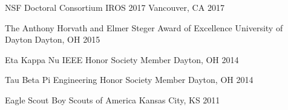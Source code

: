 




\begin{cvhonors}


\cvhonor
{NSF Doctoral Consortium} %
{IROS 2017} %
{Vancouver, CA} %
{2017} %


\cvhonor
{The Anthony Horvath and Elmer Steger Award of Excellence} %
{University of Dayton} %
{Dayton, OH} %
{2015} %


\cvhonor
{Eta Kappa Nu IEEE Honor Society} %
{Member} %
{Dayton, OH} %
{2014} %


\cvhonor
{Tau Beta Pi Engineering Honor Society} %
{Member} %
{Dayton, OH} %
{2014} %


\cvhonor
{Eagle Scout} %
{Boy Scouts of America} %
{Kansas City, KS} %
{2011} %


\end{cvhonors}